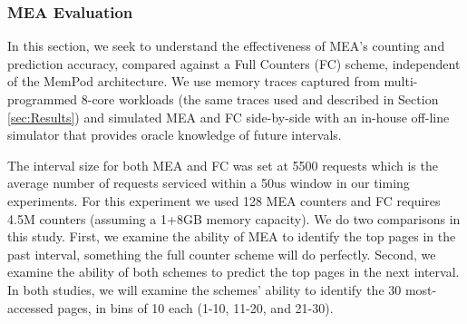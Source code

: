 
\subsubsection*{MEA Evaluation}

In this section, we seek to understand the effectiveness of MEA's counting 
and prediction accuracy, compared against a Full Counters (FC) scheme,
independent of the MemPod architecture. We use memory traces captured 
from multi-programmed 8-core workloads (the same traces used and described in Section \ref{sec:Results}) and simulated MEA and FC side-by-side with an in-house off-line simulator that provides oracle knowledge of future intervals. 

The interval size for both MEA and FC was set at 5500 requests which is the average number of requests serviced within a 50us window in our timing experiments. For this experiment we used 128 MEA counters and FC requires 4.5M counters (assuming a 1+8GB memory capacity). 
We do two comparisons in this study.  First, we examine the ability of MEA
to identify the top pages in the past interval, something the full counter
scheme will do perfectly.  Second, we examine the ability of both schemes
to predict the top pages in the next interval.  In both studies, we will
examine the schemes' ability to identify the 30 most-accessed pages, in
bins of 10 each (1-10, 11-20, and 21-30).


